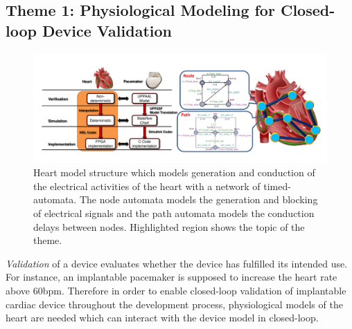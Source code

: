 \documentclass[a4paper,11pt]{article}
\begin{document}
%
%
%

\subsection{Theme 1: Physiological Modeling for Closed-loop Device Validation}
\begin{figure}[t]
	\centering
	\includegraphics[scale=0.32]{figs/mb_heart.pdf}
	\caption{\small Heart model structure which models generation and conduction of the electrical activities of the heart with a network of timed-automata. The node automata models the generation and blocking of electrical signals and the path automata models the conduction delays between nodes. Highlighted region shows the topic of the theme.}
	\label{fig:mb_heart}
\end{figure}
\emph{Validation} of a device evaluates whether the device has fulfilled its intended use.
For instance, an implantable pacemaker is supposed to increase the heart rate above 60bpm.
Therefore in order to enable closed-loop validation of implantable cardiac device throughout the development process, physiological models of the heart are needed which can interact with the device model in closed-loop. 
\end{document}
